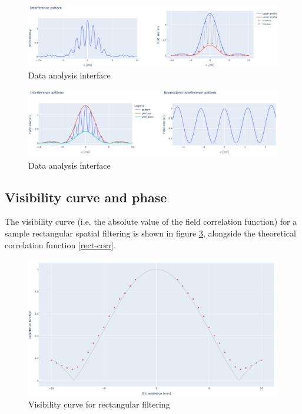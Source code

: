 \begin{figure}[!ht]
    \centering
    \includegraphics[width = \textwidth]{Img/an_11.png}
    \caption{Data analysis interface}
    \label{data_an_1}
\end{figure}

\begin{figure}[!ht]
    \centering
    \includegraphics[width = \textwidth]{Img/an_22.png}
    \caption{Data analysis interface}
    \label{data_an_2}
\end{figure}

\subsection{Visibility curve and phase}

The visibility curve (i.e. the absolute value of the field correlation function) for a sample rectangular spatial filtering is 
shown in figure \ref{vis_f}, alongside the theoretical correlation function \eqref{rect-corr}.

\begin{figure}[!ht]
    \centering
    \includegraphics[width = \textwidth]{Img/vis.png}
    \caption{Visibility curve for rectangular filtering}
    \label{vis_f}
\end{figure}

